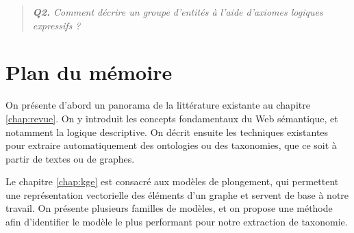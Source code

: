 \begin{quote}
    \emph{\textbf{Q2.} Comment décrire un groupe d'entités à l'aide d'axiomes logiques expressifs ?}
\end{quote}







\section{Plan du mémoire}  %



On présente d'abord un panorama de la littérature existante au chapitre \ref{chap:revue}. On y introduit les concepts fondamentaux du Web sémantique, et notamment la logique descriptive. On décrit ensuite les techniques existantes pour extraire automatiquement des ontologies ou des taxonomies, que ce soit à partir de textes ou de graphes.

Le chapitre \ref{chap:kge} est consacré aux modèles de plongement, qui permettent une représentation vectorielle des éléments d'un graphe et servent de base à notre travail. On présente plusieurs familles de modèles, et on propose une méthode afin d'identifier le modèle le plus performant pour notre extraction de taxonomie. %





